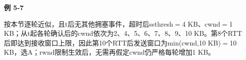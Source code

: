 {\color{ink}\bfseries 例 5-7}\par\vspace{1bp}按本节逐轮近似，且t后无其他拥塞事件，超时后ssthresh\(=\allowbreak{}\)4 KB、cwnd\(=\allowbreak{}\)1 KB；从t起各轮确认后的cwnd依次为2、4、5、6、7、8、9、10 KB。第8个RTT后即达到接收窗口上限，因此第10个RTT后发送窗口为min(cwnd,\allowbreak{}10 KB)\(=\allowbreak{}\)10 KB，选A；rwnd限制生效后，无需再假定cwnd仍严格每轮增加1 KB。
